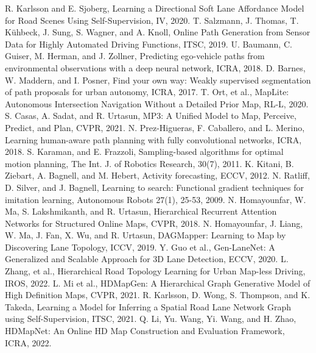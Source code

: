\documentclass[letterpaper, 10 pt, conference]{ieeeconf}
\begin{document}
\begin{thebibliography}{99}
 R. Karlsson and E. Sjoberg, Learning a Directional Soft Lane Affordance Model for Road Scenes Using Self-Supervision, IV, 2020.
 T. Salzmann, J. Thomas, T. K\"uhbeck, J. Sung, S. Wagner, and A. Knoll, Online Path Generation from Sensor Data for Highly Automated Driving Functions, ITSC, 2019.
 U. Baumann, C. Guiser, M. Herman, and J. Zollner, Predicting ego-vehicle paths from environmental observations with a deep neural network, ICRA, 2018.
 D. Barnes, W. Maddern, and I. Posner, Find your own way: Weakly supervised segmentation of path proposals for urban autonomy, ICRA, 2017.
 T. Ort, et al., MapLite: Autonomous Intersection Navigation Without a Detailed Prior Map, RL-L, 2020.
 S. Casas, A. Sadat, and R. Urtasun, MP3: A Unified Model to Map, Perceive, Predict, and Plan, CVPR, 2021.
 N. Prez-Higueras, F. Caballero, and L. Merino, Learning human-aware path planning with fully convolutional networks, ICRA, 2018.
 S. Karaman, and E. Frazzoli, Sampling-based algorithms for optimal motion planning, The Int. J. of Robotics Research, 30(7), 2011.
 K. Kitani, B. Ziebart, A. Bagnell, and M. Hebert, Activity forecasting, ECCV, 2012.
 N. Ratliff, D. Silver, and J. Bagnell, Learning to search: Functional gradient techniques for imitation learning, Autonomous Robots 27(1),
25-53, 2009.
 N. Homayounfar, W. Ma, S. Lakshmikanth, and R. Urtasun, Hierarchical Recurrent Attention Networks for Structured Online Maps, CVPR, 2018.
 N. Homayounfar, J. Liang, W. Ma, J. Fan, X. Wu, and R. Urtasun, DAGMapper: Learning to Map by Discovering Lane Topology, ICCV, 2019.
 Y. Guo et al., Gen-LaneNet: A Generalized and Scalable Approach for 3D Lane Detection, ECCV, 2020.
 L. Zhang, et al., Hierarchical Road Topology Learning for Urban Map-less Driving, IROS, 2022.
 L. Mi et al., HDMapGen: A Hierarchical Graph Generative Model of High Definition Maps, CVPR, 2021.
 R. Karlsson, D. Wong, S. Thompson, and K. Takeda, Learning a Model for Inferring a Spatial Road Lane Network Graph using Self-Supervision, ITSC, 2021.
 Q. Li, Yu. Wang, Yi. Wang, and H. Zhao, HDMapNet: An Online HD Map Construction and Evaluation Framework, ICRA, 2022.

\end{thebibliography}
\end{document}
